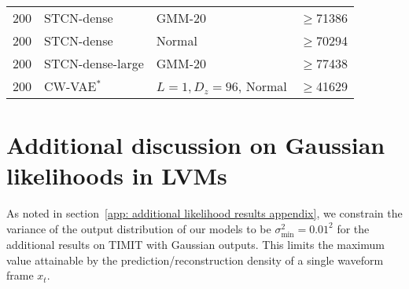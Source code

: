{\begin{table}[t!]
\begin{tabular}{lll|r}
        200 & STCN-dense {\scriptsize \parencite{aksan_stcn_2019}}                     & GMM-20 & $\geq$71386\\
        200 & STCN-dense {\scriptsize \parencite{aksan_stcn_2019}}                     & Normal & $\geq$70294\\
        200 & STCN-dense-large {\scriptsize \parencite{aksan_stcn_2019}}               & GMM-20 & $\geq$77438\\
        200 & CW-VAE$^*$                                         & $L=1, D_z=96$, Normal & $\geq$41629 \\  %
        \bottomrule
    \end{tabular}
    \label{tab: timit likelihoods gaussian appendix}
\end{table}


\section{Additional discussion on Gaussian likelihoods in LVMs} \label{app: gaussian likelihood unboundedness discussion}
As noted in section~\cref{app: additional likelihood results appendix}, we constrain the variance of the output distribution of our models to be $\sigma^2_\text{min} = 0.01^2$ for the additional results on TIMIT with Gaussian outputs. This limits the maximum value attainable by the prediction/reconstruction density of a single waveform frame $x_t$. 

}
